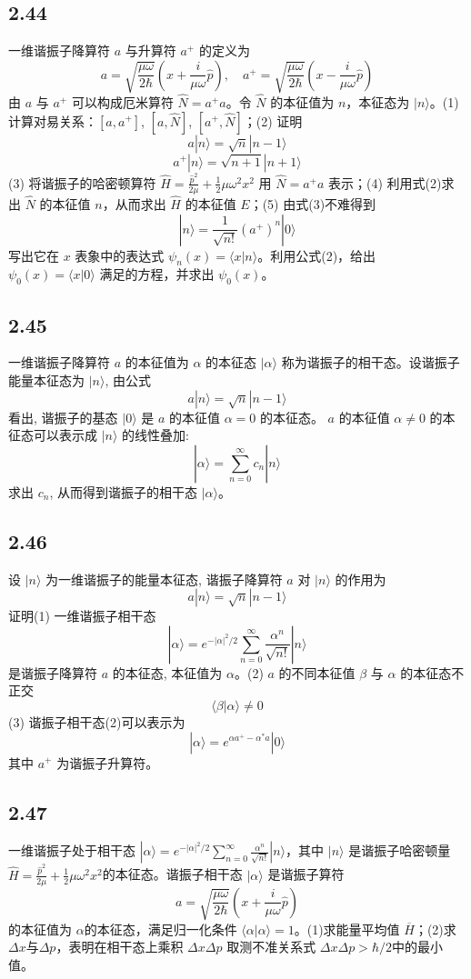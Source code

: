 \subsection{2.44}
一维谐振子降算符 $a$ 与升算符 $a^+$ 的定义为
$$a = \sqrt{\frac{\mu\omega}{2\hbar}} \left( x + \frac{i}{\mu\omega} \hat{p} \right), \quad a^+ = \sqrt{\frac{\mu\omega}{2\hbar}} \left( x - \frac{i}{\mu\omega} \hat{p} \right)$$
由 $a$ 与 $a^+$ 可以构成厄米算符 $\hat{N} = a^+ a$。令 $\hat{N}$ 的本征值为 $n$，本征态为 $|n\rangle$。(1) 计算对易关系：$[a,a^+]$, $[a,\hat{N}]$, $[a^+,\hat{N}]$；(2) 证明
$$a|n\rangle = \sqrt{n}|n-1\rangle$$
$$a^+|n\rangle = \sqrt{n+1}|n+1\rangle$$
(3) 将谐振子的哈密顿算符 $\hat{H} = \frac{\hat{p}^2}{2\mu} + \frac{1}{2}\mu\omega^2 x^2$ 用 $\hat{N} = a^+ a$ 表示；(4) 利用式(2)求出 $\hat{N}$ 的本征值 $n$，从而求出 $\hat{H}$ 的本征值 $E$；(5) 由式(3)不难得到
$$|n\rangle = \frac{1}{\sqrt{n!}}(a^+)^n |0\rangle$$
写出它在 $x$ 表象中的表达式 $\psi_n(x) = \langle x|n\rangle$。利用公式(2)，给出 $\psi_0(x) = \langle x|0\rangle$ 满足的方程，并求出 $\psi_0(x)$。

\subsection{2.45}
一维谐振子降算符 $a$ 的本征值为 $\alpha$ 的本征态 $|\alpha\rangle$ 称为谐振子的相干态。设谐振子能量本征态为 $|n\rangle$, 由公式
$$a|n\rangle = \sqrt{n}|n-1\rangle$$
看出, 谐振子的基态 $|0\rangle$ 是 $a$ 的本征值 $\alpha=0$ 的本征态。 $a$ 的本征值 $\alpha \neq 0$ 的本征态可以表示成 $|n\rangle$ 的线性叠加:
$$|\alpha\rangle = \sum_{n=0}^{\infty}c_n|n\rangle$$
求出 $c_n$, 从而得到谐振子的相干态 $|\alpha\rangle$。

\subsection{2.46}
设 $|n\rangle$ 为一维谐振子的能量本征态, 谐振子降算符 $a$ 对 $|n\rangle$ 的作用为
$$a|n\rangle = \sqrt{n}|n-1\rangle$$
证明(1) 一维谐振子相干态
$$|\alpha\rangle = e^{-|\alpha|^2/2} \sum_{n=0}^{\infty} \frac{\alpha^n}{\sqrt{n!}} |n\rangle$$
是谐振子降算符 $a$ 的本征态, 本征值为 $\alpha$。(2) $a$ 的不同本征值 $\beta$ 与 $\alpha$ 的本征态不正交
$$\langle \beta | \alpha \rangle \neq 0$$
(3) 谐振子相干态(2)可以表示为
$$|\alpha\rangle = e^{\alpha a^+ - \alpha^* a} |0\rangle$$
其中 $a^+$ 为谐振子升算符。

\subsection{2.47}
一维谐振子处于相干态 $|\alpha\rangle = e^{-|\alpha|^2/2} \sum_{n=0}^{\infty} \frac{\alpha^n}{\sqrt{n!}} |n\rangle$，其中 $|n\rangle$ 是谐振子哈密顿量 $\hat{H} = \frac{\hat{p}^2}{2\mu} + \frac{1}{2}\mu\omega^2 x^2$的本征态。谐振子相干态 $|\alpha\rangle$ 是谐振子算符
$$a = \sqrt{\frac{\mu\omega}{2\hbar}} \left( x + \frac{i}{\mu\omega} \hat{p} \right)$$
的本征值为 $\alpha$的本征态，满足归一化条件 $\langle \alpha | \alpha \rangle = 1$。(1)求能量平均值 $\overline{H}$；(2)求 $\Delta x$与$\Delta p$，表明在相干态上乘积 $\Delta x \Delta p$ 取测不准关系式 $\Delta x \Delta p > \hbar/2$中的最小值。
